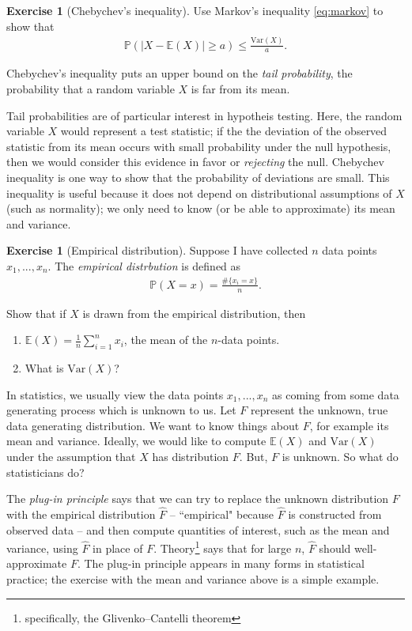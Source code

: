 \documentclass[11pt]{article}
\theoremstyle{definition}
\newtheorem{exercise}[]{Exercise}
\renewcommand{\P}{\mathbb{P}}
\newcommand{\E}{\mathbb{E}}
\newcommand{\V}{\text{Var}}
\begin{document}
\begin{exercise}[Chebychev's inequality]
  Use Markov's inequality \eqref{eq:markov} to show that
  \begin{align*}
    \P(|X - \E(X)| \geq a) \leq \frac{\V(X)}{a}.
  \end{align*}
\end{exercise}

Chebychev's inequality puts an upper bound on the \textit{tail probability},
the probability that a random variable $X$ is far from its mean.

Tail probabilities are of particular interest in hypotheis testing.
Here, the random variable $X$ would represent a test statistic;
if the the deviation of the observed statistic from its mean occurs with small probability under
the null hypothesis,
then we would consider this evidence in favor or \textit{rejecting} the null.
Chebychev inequality is one way to show that the probability of deviations are small.
This inequality is useful because it does not depend on distributional assumptions of $X$
(such as normality); we only need to know (or be able to approximate) its mean and variance.

\begin{exercise}[Empirical distribution]
Suppose I have collected $n$ data points $x_1, ..., x_n$.
The \textit{empirical distrbution}
is defined as
\begin{align*}
  \P(X = x) = \frac{\#\{x_i = x\}}{n}.
\end{align*}

Show that if $X$ is drawn from the empirical distribution, then
\begin{enumerate}[label = (\alph*)]
  \item $\E(X) = \frac{1}{n}\sum_{i=1}^n x_i$, the mean of the $n$-data points.
  \item What is $\V(X)$?
\end{enumerate}
\label{exer:empirical}
\end{exercise}

In statistics, we usually view the data points $x_1, ..., x_n$ as coming from some
data generating process which is unknown to us. Let $F$ represent the unknown, true
data generating distribution. We want to know things about $F$, for example its mean
and variance. Ideally, we would like to compute $\E(X)$ and $\V(X)$ under the assumption
that $X$ has distribution $F$. But, $F$ is unknown. So what do statisticians do?

The \textit{plug-in principle} says that we can try to replace the unknown
distribution $F$ with the empirical distribution $\hat F$ -- ``empirical" because
$\hat F$ is constructed from observed data -- and then compute quantities of interest,
such as the mean and variance,
using $\hat F$ in place of $F$.
Theory\footnote{specifically, the Glivenko–Cantelli theorem}
says that for large $n$, $\hat F$ should well-approximate $F$.
The plug-in principle
appears in many forms in statistical practice; the exercise with the mean and variance above
is a simple example.
\end{document}
